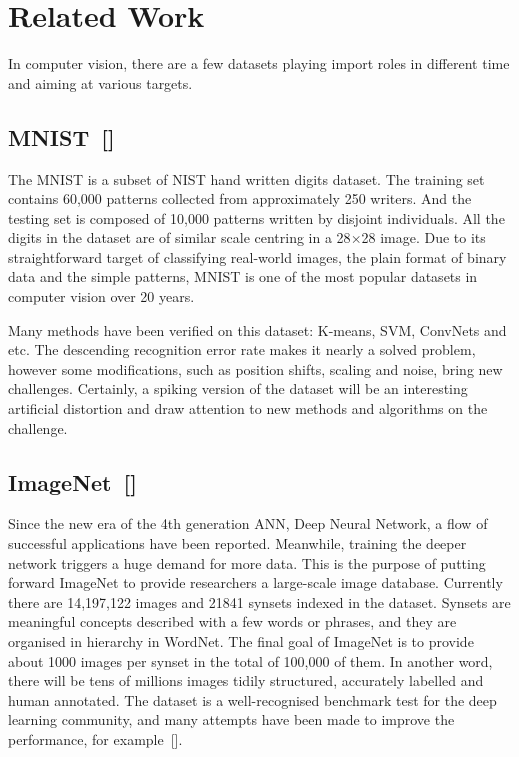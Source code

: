\section{Related Work}
\label{sec:Related}
In computer vision, there are a few datasets playing import roles in different time and aiming at various targets.
\subsection{MNIST~[\cite{lecun_gradient-based_1998}]}
The MNIST is a subset of NIST hand written digits dataset. 
The training set contains 60,000 patterns collected from approximately 250 writers.
And the testing set is composed of 10,000 patterns written by disjoint individuals.
All the digits in the dataset are of similar scale centring in a 28$ \times $28 image.
Due to its straightforward target of classifying real-world images, the plain format of binary data and the simple patterns, MNIST is one of the most popular datasets in computer vision over 20 years.

Many methods have been verified on this dataset: K-means, SVM, ConvNets and etc.
The descending recognition error rate makes it nearly a solved problem, however some modifications, such as position shifts, scaling and noise, bring new challenges.
Certainly, a spiking version of the dataset will be an interesting artificial distortion and draw attention to new methods and algorithms on the challenge. 

\subsection{ImageNet~[\cite{deng_imagenet:_2009}]}
Since the new era of the 4th generation ANN, Deep Neural Network, a flow of successful applications have been reported.
Meanwhile, training the deeper network triggers a huge demand for more data.
This is the purpose of putting forward ImageNet to provide researchers a large-scale image database.
Currently there are 14,197,122 images and 21841 synsets indexed in the dataset.
Synsets are meaningful concepts described with a few words or phrases, and they are organised in hierarchy in WordNet.
The final goal of ImageNet is to provide about 1000 images per synset in the total of 100,000 of them.
In another word, there will be tens of millions images tidily structured, accurately labelled and human annotated.
The dataset is a well-recognised benchmark test for the deep learning community, and many attempts have been made to improve the performance, for example~[\cite{krizhevsky2012imagenet}].

